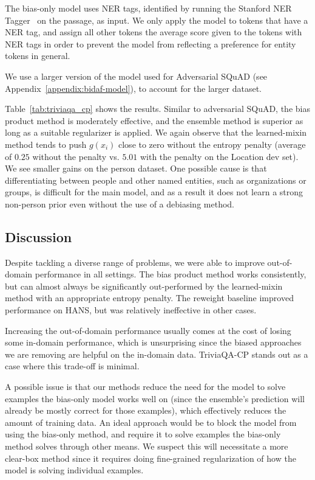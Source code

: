 \documentclass[11pt,a4paper]{article}
\begin{document}
 The bias-only model uses NER tags, identified by running the Stanford NER Tagger~\cite{corenlp_ner} on the passage, as input. We only apply the model to tokens that have a NER tag, and assign all other tokens the average score given to the tokens with NER tags in order to prevent the model from reflecting a preference for entity tokens in general.

We use a larger version of the model used for Adversarial SQuAD (see Appendix~\ref{appendix:bidaf-model}), to account for the larger dataset.

 Table~\ref{tab:triviaqa_cp} shows the results. Similar to adversarial SQuAD, the bias product method is moderately effective, and the ensemble method is superior as long as a suitable regularizer is applied. We again observe that the learned-mixin method tends to push $g(x_i)$ close to zero without the entropy penalty (average of $0.25$ without the penalty vs. $5.01$ with the penalty on the Location dev set). We see smaller gains on the person dataset. One possible cause is that differentiating between people and other named entities, such as organizations or groups, is difficult for the main model, and as a result it does not learn a strong non-person prior even without the use of a debiasing method.

\subsection{Discussion}
Despite tackling a diverse range of problems, we were able to improve out-of-domain performance in all settings. The bias product method works consistently, but can almost always be significantly out-performed by the learned-mixin method with an appropriate entropy penalty. The reweight baseline improved performance on HANS, but was relatively ineffective in other cases. 

Increasing the out-of-domain performance usually comes at the cost of losing some in-domain performance, which is unsurprising since the biased approaches we are removing are helpful on the in-domain data. TriviaQA-CP stands out as a case where this trade-off is minimal.

A possible issue is that our methods reduce the need for the model to solve examples the bias-only model works well on (since the ensemble's prediction will already be mostly correct for those examples), which effectively reduces the amount of training data. An ideal approach would be to block the model from using the bias-only method, and require it to solve examples the bias-only method solves through other means. 
We suspect this will necessitate a more clear-box method since it requires doing fine-grained regularization of how the model is solving individual examples.
 
\end{document}
